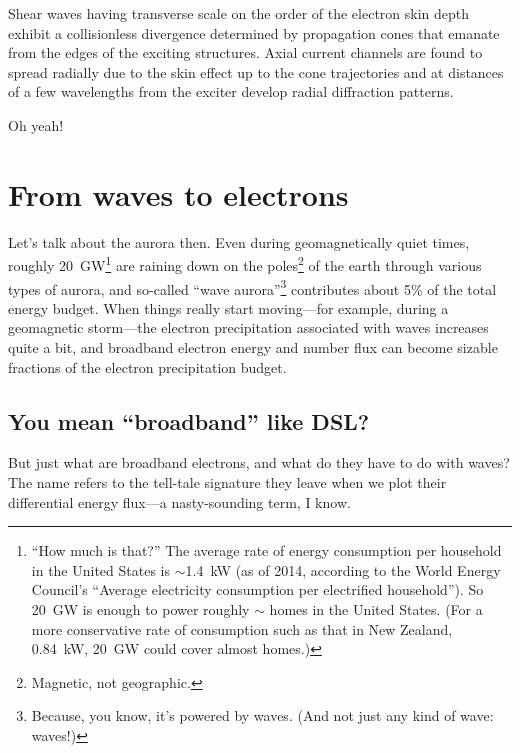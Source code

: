 \begin{displayquote}
  Shear \Alf waves having transverse scale on the order of the electron skin
  depth exhibit a collisionless divergence determined by propagation cones that
  emanate from the edges of the exciting structures. Axial current channels are
  found to spread radially due to the skin effect up to the cone trajectories
  and at distances of a few wavelengths from the exciter develop radial
  diffraction patterns.
\end{displayquote}

Oh yeah!

\section{From waves to electrons}

Let's talk about the aurora then. Even during geomagnetically quiet times,
roughly 20~GW\footnote{``How much is that?'' The average rate of energy
  consumption per household in the United States is $\sim$1.4~kW (as of 2014,
  according to the World Energy Council's ``Average electricity consumption per
  electrified household''). So 20~GW is enough to power roughly
  $\sim$ homes in the United States. (For a more conservative
  rate of consumption such as that in New Zealand, 0.84~kW, 20~GW could cover
  almost  homes.)} \citep{Newell2009} are raining down on the
poles\footnote{Magnetic, not geographic.} of the earth through various types of
aurora, and so-called ``wave aurora''\footnote{Because, you know, it's powered
  by waves. (And not just any kind of wave: \Alf waves!)} contributes about 5\%
of the total energy budget. When things really start moving---for example,
during a geomagnetic storm---the electron precipitation associated with \Alf
waves increases quite a bit, and broadband electron energy and number flux can
become sizable fractions of the electron precipitation budget.

\subsection{You mean ``broadband'' like DSL?}

But just what are broadband electrons, and what do they have to do with \Alf
waves? The name refers to the tell-tale signature they leave when we plot their
differential energy flux---a nasty-sounding term, I know.


